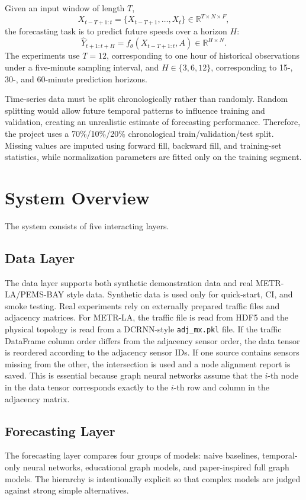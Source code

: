 \documentclass[11pt]{article}
\begin{document}
Given an input window of length $T$,
\begin{equation}
  X_{t-T+1:t}=\{X_{t-T+1},\ldots,X_t\}\in\mathbb{R}^{T\times N\times F},
\end{equation}
the forecasting task is to predict future speeds over a horizon $H$:
\begin{equation}
  \hat{Y}_{t+1:t+H}=f_\theta(X_{t-T+1:t}, A)\in\mathbb{R}^{H\times N}.
\end{equation}
The experiments use $T=12$, corresponding to one hour of historical observations under a five-minute sampling interval, and $H\in\{3,6,12\}$, corresponding to 15-, 30-, and 60-minute prediction horizons.

Time-series data must be split chronologically rather than randomly. Random splitting would allow future temporal patterns to influence training and validation, creating an unrealistic estimate of forecasting performance. Therefore, the project uses a 70\%/10\%/20\% chronological train/validation/test split. Missing values are imputed using forward fill, backward fill, and training-set statistics, while normalization parameters are fitted only on the training segment.

\section{System Overview}
The system consists of five interacting layers.

\subsection{Data Layer}
The data layer supports both synthetic demonstration data and real METR-LA/PEMS-BAY style data. Synthetic data is used only for quick-start, CI, and smoke testing. Real experiments rely on externally prepared traffic files and adjacency matrices. For METR-LA, the traffic file is read from HDF5 and the physical topology is read from a DCRNN-style \texttt{adj\_mx.pkl} file. If the traffic DataFrame column order differs from the adjacency sensor order, the data tensor is reordered according to the adjacency sensor IDs. If one source contains sensors missing from the other, the intersection is used and a node alignment report is saved. This is essential because graph neural networks assume that the $i$-th node in the data tensor corresponds exactly to the $i$-th row and column in the adjacency matrix.

\subsection{Forecasting Layer}
The forecasting layer compares four groups of models: naive baselines, temporal-only neural networks, educational graph models, and paper-inspired full graph models. The hierarchy is intentionally explicit so that complex models are judged against strong simple alternatives.
\end{document}
